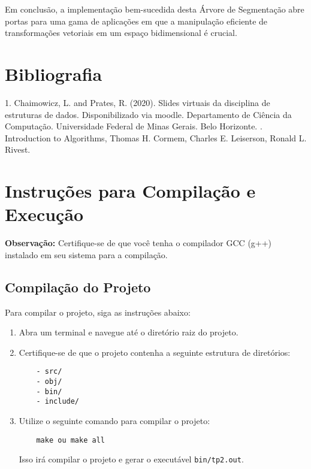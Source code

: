 \documentclass{article}
\begin{document}
Em conclusão, a implementação bem-sucedida desta Árvore de Segmentação abre portas para uma gama de aplicações em que a manipulação eficiente de transformações vetoriais em um espaço bidimensional é crucial.






\section{Bibliografia}
1. Chaimowicz, L. and Prates, R. (2020). Slides virtuais da disciplina de estruturas de dados. Disponibilizado via moodle. Departamento de Ciência da Computação. Universidade
Federal de Minas Gerais. Belo Horizonte. 
. Introduction to Algorithms, Thomas H. Cormem, Charles E. Leiserson, Ronald L. Rivest.




\appendix
\newpage
\section{Instruções para Compilação e Execução}
\label{ap:compilacao_execucao}

\textbf{Observação:} Certifique-se de que você tenha o compilador GCC (g++) instalado em seu sistema para a compilação.

\subsection{Compilação do Projeto}

Para compilar o projeto, siga as instruções abaixo:

\begin{enumerate}
    \item Abra um terminal e navegue até o diretório raiz do projeto.
    \item Certifique-se de que o projeto contenha a seguinte estrutura de diretórios:
    
    \begin{verbatim}
    - src/
    - obj/
    - bin/
    - include/
    \end{verbatim}

    \item Utilize o seguinte comando para compilar o projeto:

    \begin{verbatim}
    make ou make all
    \end{verbatim}

    Isso irá compilar o projeto e gerar o executável \texttt{bin/tp2.out}.

\end{enumerate}
\end{document}
